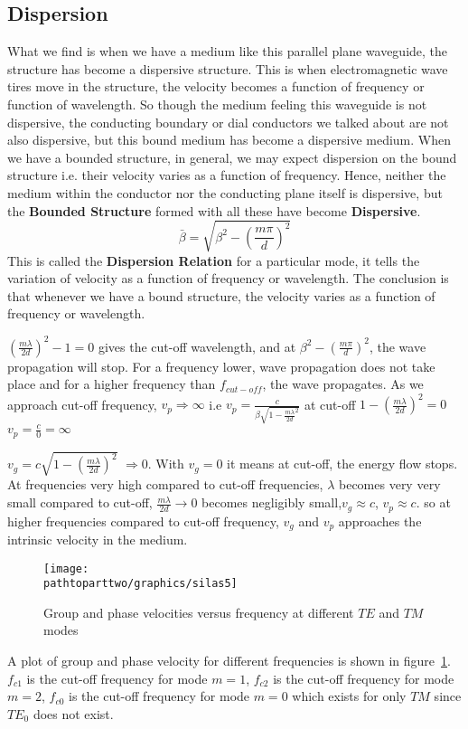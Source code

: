 \subsection{Dispersion}
What we find is when we have a medium like this parallel plane waveguide, the structure has become a dispersive structure. This is when electromagnetic wave tires move in the structure, the velocity becomes a function of frequency or function of wavelength. So though the medium feeling this waveguide is not dispersive, the conducting boundary or dial conductors we talked about are not also dispersive, but this bound medium has become a dispersive medium. When we have a bounded structure, in general, we may expect dispersion on the bound structure i.e. their velocity varies as a function of frequency. Hence, neither the medium within the conductor nor the conducting plane itself is dispersive, but the \textbf{Bounded Structure} formed with all these have become \textbf{Dispersive}.
\begin{equation}
\bar{\beta} = \sqrt{\beta^{2} -\left(\frac{m\pi}{d}\right)^{2}}
\end{equation} 
This is called the \textbf{Dispersion Relation} for a particular mode, it tells the variation of velocity as a function of frequency or wavelength. The conclusion is that whenever we have a bound structure, the velocity varies as a function of frequency or wavelength.

$(\frac{m\lambda}{2d})^{2} -1=0$ gives the cut-off wavelength, and at $\beta^{2} -(\frac{m\pi}{d})^{2}$, the wave propagation will stop. For a frequency lower, wave propagation does not take place and for a higher frequency than $f_{cut-off}$, the wave propagates. As we approach cut-off frequency, $v_{p}\Rightarrow \infty$ i.e $v_{p}= \frac{c}{\beta \sqrt{1- \frac{m \lambda}{2d}^{2}}}$ at cut-off $1 - (\frac{m\lambda}{2d})^{2}=0$ $v_{p} =\frac{c}{0} =\infty$

$v_{g} =c \sqrt{1-(\frac{m\lambda}{2d})^{2}}$ $\Rightarrow 0$. With $v_{g} = 0$ it means at cut-off, the energy flow stops. At frequencies very high compared to cut-off frequencies, $\lambda$ becomes very very small compared to cut-off, $\frac{m\lambda}{2d} \rightarrow 0$ becomes negligibly small,$v_{g} \approx c$, $v_{p} \approx c$. so at higher frequencies compared to cut-off frequency, $v_{g}$ and $v_{p}$ approaches the intrinsic velocity in the medium.
\begin{figure}[h]
\centering
\texttt{[image: \\pathtoparttwo/graphics/silas5]}
\caption{Group and phase velocities versus frequency at different $TE$ and $TM$ modes}
\label{fig:silas5}
\end{figure}
A plot of group and phase velocity for different frequencies is shown in figure~\ref{fig:silas5}. $f_{c1}$ is the cut-off frequency for mode $m=1$, $f_{c2}$ is the cut-off frequency for mode $m=2$, $f_{c0}$ is the cut-off frequency for mode $m=0$ which exists for only $TM$ since $TE_0$ does not exist.

